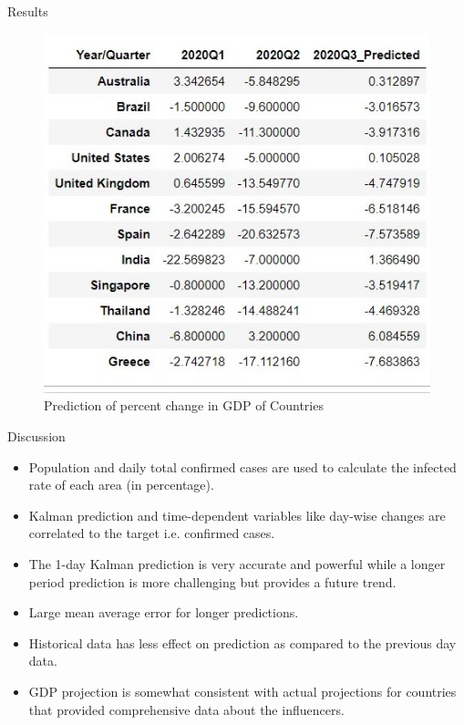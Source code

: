 \documentclass[11pt]{beamer}
\begin{document}
\begin{frame}{Results}
\begin{figure}
\includegraphics[scale=0.7]{gdp_prediction.jpeg}
\caption{Prediction of percent change in GDP of Countries}
\end{figure}
\end{frame}

\begin{frame}{Discussion}
\begin{itemize}
\item Population and daily total confirmed cases are used to calculate the infected rate of each area (in percentage).
\item Kalman prediction and time-dependent variables like day-wise changes are correlated to the target i.e. confirmed cases.
\item The 1-day Kalman prediction is very accurate and powerful while a longer period prediction is more challenging but provides a future trend.
\item Large mean average error for longer predictions.
\item Historical data has less effect on prediction as compared to the previous day data.
\item GDP projection is somewhat consistent with actual projections for countries that provided comprehensive data about the influencers.
\end{itemize}
\end{frame}
\end{document}
